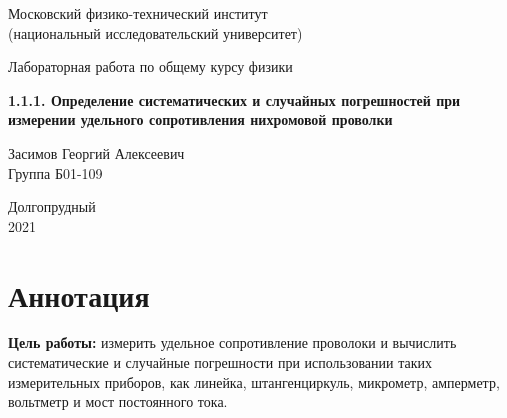 




\begin{titlepage}

    \newpage
    \begin{center}
        \normalsize Московский физико-технический институт \\(национальный исследовательский университет)
    \end{center}

    \vspace{6em}

    \begin{center}
        \Large Лабораторная работа по общему курсу физики\\
    \end{center}

    \vspace{1em}

    \begin{center}
        \Large \textbf{1.1.1. Определение систематических и случайных погрешностей при измерении удельного сопротивления нихромовой проволки}
    \end{center}

    \vspace{2em}

    \begin{center}
        \large Засимов Георгий Алексеевич \\
        Группа Б01-109
    \end{center}

    \vspace{\fill}

    \begin{center}
    Долгопрудный \\2021
    \end{center}
    
\end{titlepage}


    \thispagestyle{empty}
    \newpage
    \tableofcontents
    \newpage
    \setcounter{page}{1}

\section{Аннотация}

\textbf{Цель работы:} измерить удельное сопротивление проволоки и вычислить систематические и случайные погрешности при использовании таких измерительных приборов, как линейка, штангенциркуль, микрометр, амперметр, вольтметр и мост постоянного тока.\\


